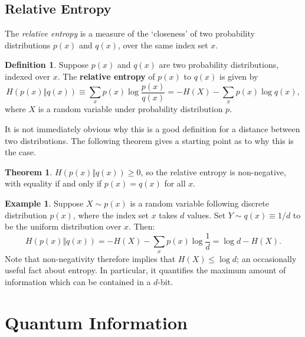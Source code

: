 \documentclass[12pt,a4paper]{report}
\numberwithin{equation}{section}
\theoremstyle{definition}
\newtheorem{definition}{Definition}[section]
\theoremstyle{theorem}
\newtheorem{theorem}{Theorem}[section]
\theoremstyle{theorem}
\theoremstyle{example}
\newtheorem{example}{Example}[section]
\theoremstyle{definition}
\begin{document}
\subsection{Relative Entropy}
The \textit{relative entropy} is a measure of the `closeness' of two probability distributions $p(x)$ and $q(x)$, over the same index set $x$. 
\begin{definition}
	Suppose $p(x)$ and $q(x)$ are two probability distributions, indexed over $x$. The \textbf{relative entropy} of $p(x)$ to $q(x)$ is given by
	\begin{equation}
		H(p(x)\Vert q(x))\equiv\sum_{x}p(x)\log\frac{p(x)}{q(x)}=-H(X)-\sum_{x}p(x)\log{q(x)},
	\end{equation}
	where $X$ is a random variable under probability distribution $p$.
\end{definition}
It is not immediately obvious why this is a good definition for a distance between two distributions. The following theorem gives a starting point as to why this is the case.
\begin{theorem}
	$H(p(x)\Vert q(x))\geq0$, so the relative entropy is non-negative, with equality if and only if $p(x)=q(x)$ for all $x$.
\end{theorem}
\begin{example}
	Suppose $X\sim p(x)$ is a random variable following discrete distribution $p(x)$, where the index set $x$ takes $d$ values. Set $Y\sim q(x)\equiv 1/d$ to be the uniform distribution over $x$. Then:
	\begin{equation}
		H(p(x)\Vert q(x))=-H(X)-\sum_{x}p(x)\log\frac{1}{d}=\log{d}-H(X).
	\end{equation}
	Note that non-negativity therefore implies that $H(X)\leq\log{d}$; an occasionally useful fact about entropy. In particular, it quantifies the maximum amount of information which can be contained in a $d$-bit.
\end{example}
\section{Quantum Information}
\end{document}
